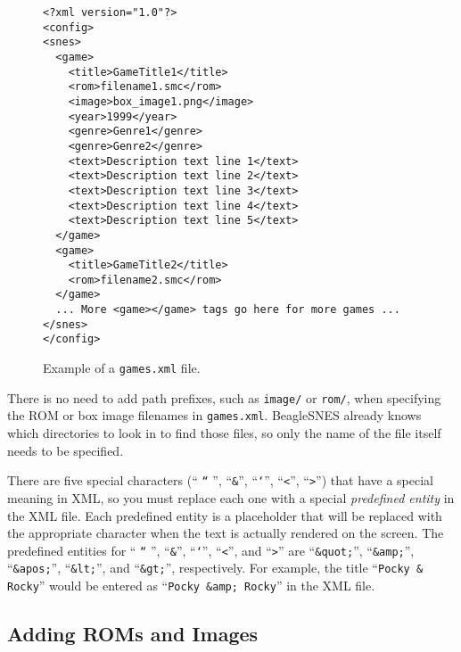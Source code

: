\begin{figure}[h]
\begin{verbatim}<?xml version="1.0"?>
<config>
<snes>
  <game>
    <title>GameTitle1</title>
    <rom>filename1.smc</rom>
    <image>box_image1.png</image>
    <year>1999</year>
    <genre>Genre1</genre>
    <genre>Genre2</genre>
    <text>Description text line 1</text>
    <text>Description text line 2</text>
    <text>Description text line 3</text>
    <text>Description text line 4</text>
    <text>Description text line 5</text>
  </game>
  <game>
    <title>GameTitle2</title>
    <rom>filename2.smc</rom>
  </game>
  ... More <game></game> tags go here for more games ...
</snes>
</config>\end{verbatim}
\vspace{-0.3in}
\caption{Example of a \texttt{games.xml} file.}\label{fig:games_xml}
\end{figure}

\begin{updateWarn}
There is no need to add path prefixes, such as \texttt{image/} or \texttt{rom/}, when specifying the ROM or box image filenames in \texttt{games.xml}. BeagleSNES already knows which directories to look in to find those files, so only the name of the file itself needs to be specified.
\end{updateWarn}

\begin{updateWarn}
There are five special characters (`` \texttt{``} '', ``\texttt{\&}'', ``\texttt{`}'', ``\texttt{<}'', ``\texttt{>}'') that have a special meaning in XML, so you must replace each one with a special \emph{predefined entity} in the XML file. Each predefined entity is a placeholder that will be replaced with the appropriate character when the text is actually rendered on the screen.  The predefined entities for `` \texttt{``} '', ``\texttt{\&}'', ``\texttt{`}'', ``\texttt{<}'', and ``\texttt{>}'' are ``\texttt{\&quot;}'', ``\texttt{\&amp;}'', ``\texttt{\&apos;}'', ``\texttt{\&lt;}'', and ``\texttt{\&gt;}'', respectively. For example, the title ``\texttt{Pocky \& Rocky}'' would be entered as ``\texttt{Pocky \&amp; Rocky}'' in the XML file.
\end{updateWarn}

\subsection{Adding ROMs and Images}\label{sec:add_files}

